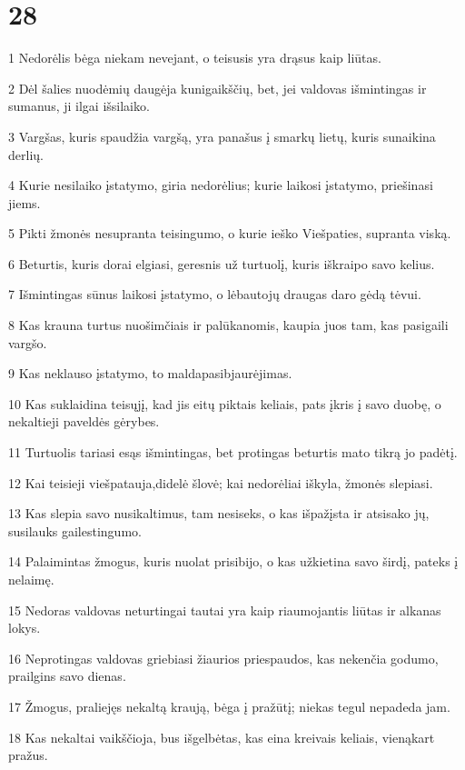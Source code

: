 \chapter{28}


\par 1 Nedorėlis bėga niekam nevejant, o teisusis yra drąsus kaip liūtas. 
\par 2 Dėl šalies nuodėmių daugėja kunigaikščių, bet, jei valdovas išmintingas ir sumanus, ji ilgai išsilaiko. 
\par 3 Vargšas, kuris spaudžia vargšą, yra panašus į smarkų lietų, kuris sunaikina derlių. 
\par 4 Kurie nesilaiko įstatymo, giria nedorėlius; kurie laikosi įstatymo, priešinasi jiems. 
\par 5 Pikti žmonės nesupranta teisingumo, o kurie ieško Viešpaties, supranta viską. 
\par 6 Beturtis, kuris dorai elgiasi, geresnis už turtuolį, kuris iškraipo savo kelius. 
\par 7 Išmintingas sūnus laikosi įstatymo, o lėbautojų draugas daro gėdą tėvui. 
\par 8 Kas krauna turtus nuošimčiais ir palūkanomis, kaupia juos tam, kas pasigaili vargšo. 
\par 9 Kas neklauso įstatymo, to malda­pasibjaurėjimas. 
\par 10 Kas suklaidina teisųjį, kad jis eitų piktais keliais, pats įkris į savo duobę, o nekaltieji paveldės gėrybes. 
\par 11 Turtuolis tariasi esąs išmintingas, bet protingas beturtis mato tikrą jo padėtį. 
\par 12 Kai teisieji viešpatauja,­didelė šlovė; kai nedorėliai iškyla, žmonės slepiasi. 
\par 13 Kas slepia savo nusikaltimus, tam nesiseks, o kas išpažįsta ir atsisako jų, susilauks gailestingumo. 
\par 14 Palaimintas žmogus, kuris nuolat prisibijo, o kas užkietina savo širdį, pateks į nelaimę. 
\par 15 Nedoras valdovas neturtingai tautai yra kaip riaumojantis liūtas ir alkanas lokys. 
\par 16 Neprotingas valdovas griebiasi žiaurios priespaudos, kas nekenčia godumo, prailgins savo dienas. 
\par 17 Žmogus, praliejęs nekaltą kraują, bėga į pražūtį; niekas tegul nepadeda jam. 
\par 18 Kas nekaltai vaikščioja, bus išgelbėtas, kas eina kreivais keliais, vienąkart pražus. 
